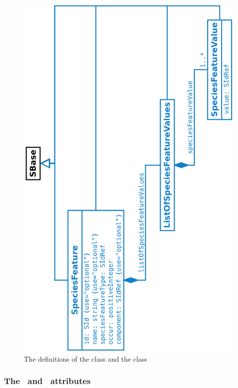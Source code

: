\begin{figure}[htb]
  \begin{center}
    \includegraphics[angle=-90, scale=0.35]{./figs/multi_009_SpeciesFeature.pdf}
    \caption{The definitions of the \SpeciesFeature class and the \SpeciesFeatureValue class}
  \label{fig:SpeciesFeature}
  \end{center}
\end{figure}


\subsubsection{The \idAtt\ and \nameAtt\ attributes}
\label{def:SpeciesFeature:id}

